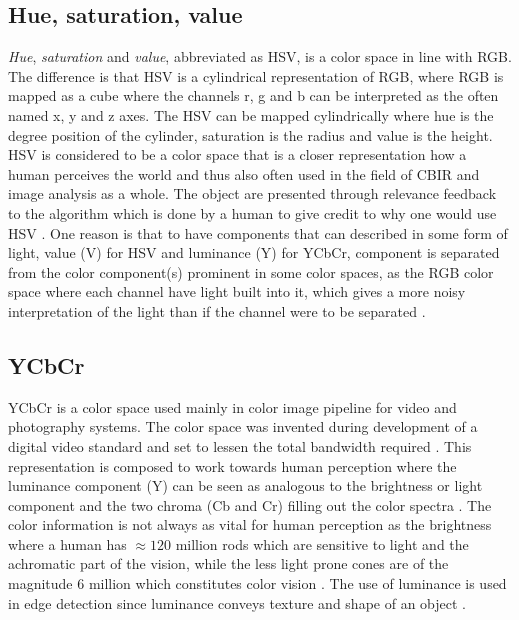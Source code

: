 \subsection{Hue, saturation, value}
\label{sec:HSV_theory}
\emph{Hue}, \emph{saturation} and \emph{value}, abbreviated as HSV, is a color space in line with RGB. The difference is that HSV is a cylindrical representation of RGB, where RGB is mapped as a cube where the channels r, g and b can be interpreted as the often named x, y and z axes. The HSV can be mapped cylindrically where hue is the degree position of the cylinder, saturation is the radius and value is the height. HSV is considered to be a color space that is a closer representation how a human perceives the world and thus also often used in the field of CBIR and image analysis as a whole. The object are presented through relevance feedback to the algorithm which is done by a human to give credit to why one would use HSV . One reason is that to have components that can described in some form of light, value (V) for HSV and luminance (Y) for YCbCr, component is separated from the color component(s) prominent in some color spaces, as the RGB color space where each channel have light built into it, which gives a more noisy interpretation of the light than if the channel were to be separated . 

\subsection{YCbCr}
\label{sec:ycbcr}
YCbCr is a color space used mainly in color image pipeline  for video and photography systems. The color space was invented during development of a digital video standard and set to lessen the total bandwidth required . This representation is composed to work towards human perception where the luminance component (Y) can be seen as analogous to the brightness or light component and the two chroma (Cb and Cr) filling out the color spectra \cite{midha2014analysis}. The color information is not always as vital for human perception as the brightness where a human has $\approx120$ million rods which are sensitive to light and the achromatic part of the vision, while the less light prone cones  are of the magnitude 6 million which constitutes color vision . The use of luminance is used in edge detection since luminance conveys texture and shape of an object \cite{su2011coldimage}\cite{prajapatiedge} . 


